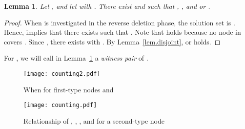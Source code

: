 \documentclass[11pt]{article}
\newtheorem{lemma}{Lemma}
\begin{document}
  \begin{lemma}\label{lem.witness}
   Let ,
   and let  with .
   There exist
    and  such that ,
    , and
    or .
  \end{lemma}
   \begin{proof}
    When  is investigated in the reverse deletion phase,
    the solution set  is .
    Hence, 
     implies that
    there exists 
    such that 
    .
      Note that  holds because
    no node in  covers .
    Since ,
     there exists  with .
    By Lemma~\ref{lem.disjoint},  or  holds.
   \end{proof}

  For , we will call  in Lemma~\ref{lem.witness} a
  \emph{witness pair} of .

 \begin{figure}[t]
  \centering
 \texttt{[image: counting2.pdf]}
 \caption{When  for first-type nodes  and }
 \label{fig:counting2}
 \end{figure}

 \begin{figure}[t]
  \centering
\texttt{[image: counting.pdf]}
 \caption{Relationship of , , , and  for a second-type node }
 \label{fig:counting}
 \end{figure}
  
\end{document}
